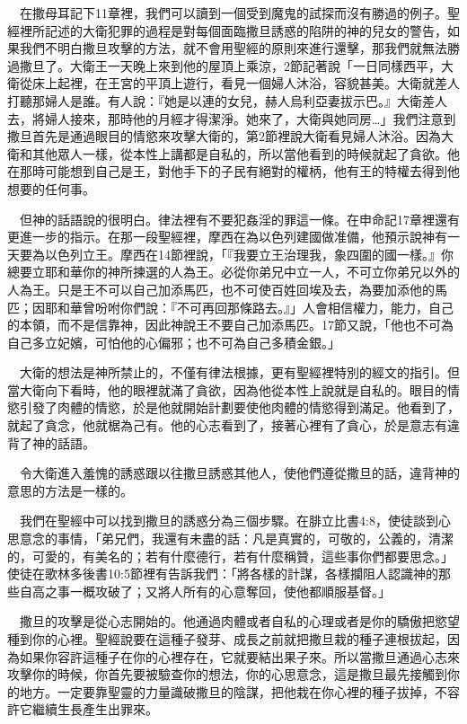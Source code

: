 \documentclass{book}
\begin{document}
　在撒母耳記下11章裡，我們可以讀到一個受到魔鬼的試探而沒有勝過的例子。聖經裡所記述的大衛犯罪的過程是對每個面臨撒旦誘惑的陷阱的神的兒女的警告，如果我們不明白撒旦攻擊的方法，就不會用聖經的原則來進行還擊，那我們就無法勝過撒旦了。大衛王一天晚上來到他的屋頂上乘涼，2節記著說「一日同樣西平，大衛從床上起裡，在王宮的平頂上遊行，看見一個婦人沐浴，容貌甚美。大衛就差人打聽那婦人是誰。有人說：『她是以連的女兒，赫人烏利亞妻拔示巴。』大衛差人去，將婦人接來，那時他的月經才得潔淨。她來了，大衛與她同房…」我們注意到撒旦首先是通過眼目的情慾來攻擊大衛的，第2節裡說大衛看見婦人沐浴。因為大衛和其他眾人一樣，從本性上講都是自私的，所以當他看到的時候就起了貪欲。他在那時可能想到自己是王，對他手下的子民有絕對的權柄，他有王的特權去得到他想要的任何事。

　但神的話語說的很明白。律法裡有不要犯姦淫的罪這一條。在申命記17章裡還有更進一步的指示。在那一段聖經裡，摩西在為以色列建國做准備，他預示說神有一天要為以色列立王。摩西在14節裡說，「『我要立王治理我，象四圍的國一樣。』你總要立耶和華你的神所揀選的人為王。必從你弟兄中立一人，不可立你弟兄以外的人為王。只是王不可以自己加添馬匹，也不可使百姓回埃及去，為要加添他的馬匹；因耶和華曾吩咐你們說：『不可再回那條路去。』」人會相信權力，能力，自己的本領，而不是信靠神，因此神說王不要自己加添馬匹。17節又說，「他也不可為自己多立妃嬪，可怕他的心偏邪；也不可為自己多積金銀。」

　大衛的想法是神所禁止的，不僅有律法根據，更有聖經裡特別的經文的指引。但當大衛向下看時，他的眼裡就滿了貪欲，因為他從本性上說就是自私的。眼目的情慾引發了肉體的情慾，於是他就開始計劃要使他肉體的情慾得到滿足。他看到了，就起了貪念，他就椐為己有。他的心志看到了，接著心裡有了貪心，於是意志有違背了神的話語。

　令大衛進入羞愧的誘惑跟以往撒旦誘惑其他人，使他們遵從撒旦的話，違背神的意思的方法是一樣的。

　我們在聖經中可以找到撒旦的誘惑分為三個步驟。在腓立比書4:8，使徒談到心思意念的事情，「弟兄們，我還有未盡的話：凡是真實的，可敬的，公義的，清潔的，可愛的，有美名的；若有什麼德行，若有什麼稱贊，這些事你們都要思念。」使徒在歌林多後書10:5節裡有告訴我們：「將各樣的計謀，各樣攔阻人認識神的那些自高之事一概攻破了；又將人所有的心意奪回，使他都順服基督。」

　撒旦的攻擊是從心志開始的。他通過肉體或者自私的心理或者是你的驕傲把慾望種到你的心裡。聖經說要在這種子發芽、成長之前就把撒旦栽的種子連根拔起，因為如果你容許這種子在你的心裡存在，它就要結出果子來。所以當撒旦通過心志來攻擊你的時候，你首先要被驗查你的想法，你的心思意念，這是撒旦最先接觸到你的地方。一定要靠聖靈的力量識破撒旦的陰謀，把他栽在你心裡的種子拔掉，不容許它繼續生長產生出罪來。
\end{document}
